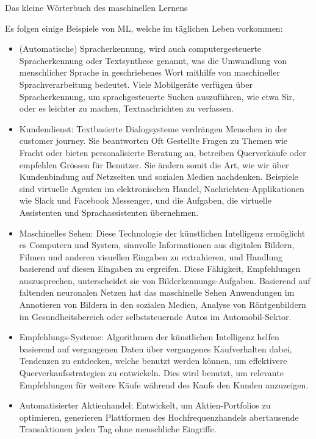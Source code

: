 \begin{lpu}{Das kleine Wörterbuch des maschinellen Lernens}
\begin{artikelbox}
Es folgen einige Beispiele von ML, welche im täglichen Leben vorkommen: 
\begin{itemize}
\item (Automatische) Spracherkennung, wird auch computergesteuerte Spracherkennung oder Textsynthese genannt, was die Umwandlung von menschlicher Sprache in geschriebenes Wort mithilfe von maschineller Sprachverarbeitung bedeutet. Viele Mobilgeräte verfügen über Spracherkennung, um sprachgesteuerte Suchen auszuführen, wie etwa Sir, oder es leichter zu machen, Textnachrichten zu verfassen.
\item Kundendienst: Textbasierte Dialogsysteme verdrängen Menschen in der customer journey. Sie beantworten Oft Gestellte Fragen zu Themen wie Fracht oder bieten personalisierte Beratung an, betreiben Querverkäufe oder empfehlen Grössen für Benutzer. Sie ändern somit die Art, wie wir über Kundenbindung auf Netzseiten und sozialen Medien nachdenken. Beispiele sind virtuelle Agenten im elektronischen Handel, Nachrichten-Applikationen wie Slack und Facebook Messenger, und die Aufgaben, die virtuelle Assistenten und Sprachassistenten übernehmen.
\item Maschinelles Sehen: Diese Technologie der künstlichen Intelligenz ermöglicht es Computern und System, sinnvolle Informationen aus digitalen Bildern, Filmen und anderen visuellen Eingaben zu extrahieren, und Handlung basierend auf diesen Eingaben zu ergreifen. Diese Fähigkeit, Empfehlungen auszusprechen, unterscheidet sie von Bilderkennungs-Aufgaben. Basierend auf faltenden neuronalen Netzen hat das maschinelle Sehen Anwendungen im Annotieren von Bildern in den sozialen Medien, Analyse von Röntgenbildern im Gesundheitsbereich oder selbststeuernde Autos im Automobil-Sektor.
\item Empfehlungs-Systeme: Algorithmen der künstlichen Intelligenz helfen basierend auf vergangenen Daten über vergangenes Kaufverhalten dabei, Tendenzen zu entdecken, welche benutzt werden können, um effektivere Querverkaufsstrategien zu entwickeln. Dies wird benutzt, um relevante Empfehlungen für weitere Käufe während des Kaufs den Kunden anzuzeigen.
\item Automatisierter Aktienhandel: Entwickelt, um Aktien-Portfolios zu optimieren, generieren Plattformen des Hochfrequenzhandels abertausende Transaktionen jeden Tag ohne menschliche Eingriffe.
\end{itemize}
\end{artikelbox}


\end{lpu}
